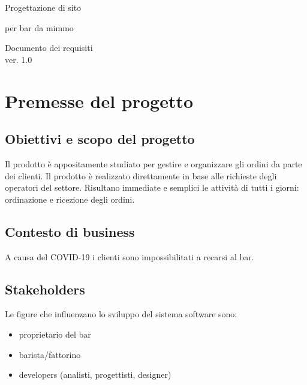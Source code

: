 \documentclass[a4paper,11pt]{article}       %
\begin{document}
\begin{titlepage}
    \centering
        \vspace*{1in}
        \begin{Large}
            Progettazione di sito
  
            per bar da mimmo\par
        \end{Large} 
        \vspace{1.5in}
        \vfill
        Documento dei requisiti\\
        \vspace{0.1in}ver. 1.0
        \par
        \vspace{0.5in}
            \date{05/12/2020}
        \par
\end{titlepage}


\tableofcontents
\newpage


\section{Premesse del progetto}
    \subsection{Obiettivi e scopo del progetto}
    Il prodotto è appositamente studiato per gestire e organizzare gli ordini da
	parte dei clienti. Il prodotto è realizzato direttamente in base alle richieste degli operatori del settore. Risultano immediate e semplici le attività di tutti i giorni: ordinazione e ricezione degli ordini.
    
    \subsection{Contesto di business}
    A causa del COVID-19 i clienti sono impossibilitati a recarsi al bar.
    
    \subsection{Stakeholders}
    Le figure che influenzano lo sviluppo del sistema software sono:
    \begin{itemize}
        \item proprietario del bar
        \item barista/fattorino
        \item developers (analisti, progettisti, designer)
    \end{itemize}
\end{document}

